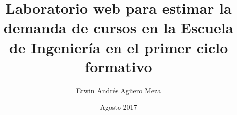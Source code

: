 \documentclass[pdftex,spanish]{pucthesis}	%
\begin{document}

\title[(LONG THESIS TITLE)]
   {\bf Laboratorio web para estimar la demanda de cursos en la Escuela de Ingeniería en el primer ciclo formativo}
\author[Author's Name]{Erwin Andrés Agüero Meza}

\address{Escuela de Ingenier\'ia\\
                   Pontificia Universidad Cat\'olica de Chile\\
                   Vicu\~na Mackenna 4860\\
                  Santiago, Chile\\
                  {\it Tel.\/} : 56 (2) 354-2000}

\ogrsmember                 {}
\subject                            {Ciencias de la Computación}
\date                                 {Agosto 2017}
\dedication                      {A todos aquellos que contribuyeron en mi paso por la universidad :)}


\NoChapterPageNumber
{}
\maketitle



\end{document}
